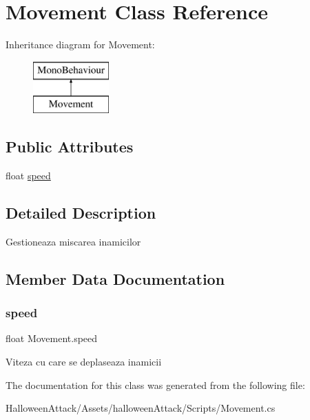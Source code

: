 \hypertarget{class_movement}{}\section{Movement Class Reference}
\label{class_movement}
Inheritance diagram for Movement\+:\begin{figure}[H]
\begin{center}
\leavevmode
\includegraphics[height=2.000000cm]{class_movement}
\end{center}
\end{figure}
\subsection*{Public Attributes}
\begin{DoxyCompactItemize}
\item 
float \hyperlink{class_movement_aba07bc6bfeba07294bfd68dec4962388}{speed}
\end{DoxyCompactItemize}


\subsection{Detailed Description}
Gestioneaza miscarea inamicilor 

\subsection{Member Data Documentation}
\mbox{\label{class_movement_aba07bc6bfeba07294bfd68dec4962388}} 
\subsubsection{\texorpdfstring{speed}{speed}}
{\footnotesize\ttfamily float Movement.\+speed}

Viteza cu care se deplaseaza inamicii 

The documentation for this class was generated from the following file\+:\begin{DoxyCompactItemize}
\item 
Halloween\+Attack/\+Assets/halloween\+Attack/\+Scripts/Movement.\+cs\end{DoxyCompactItemize}
